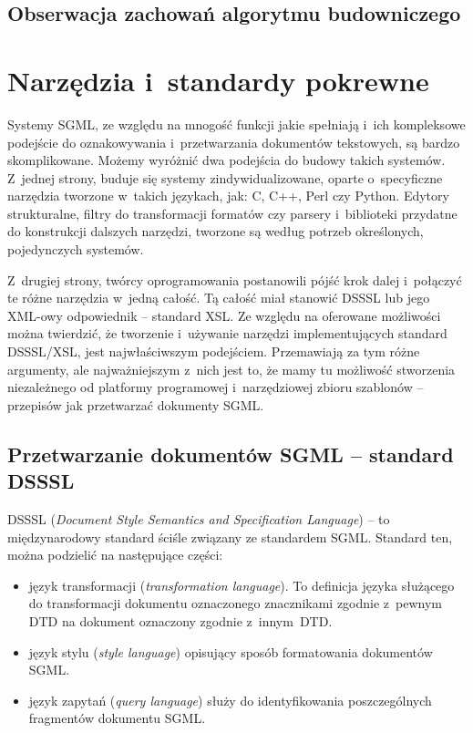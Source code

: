 \documentclass[document]{xmgr}
\begin{document}
\section{Obserwacja zachowań algorytmu budowniczego}

\chapter{Narzędzia i~standardy pokrewne}

Systemy SGML, ze względu na mnogość funkcji jakie spełniają i~ich
kompleksowe podejście do oznakowywania i~przetwarzania dokumentów
tekstowych, są bardzo skomplikowane. Możemy wyróżnić dwa podejścia do
budowy takich systemów.  Z~jednej strony, buduje się systemy
zindywidualizowane, oparte o~specyficzne narzędzia tworzone w~takich
językach, jak: C, C++, Perl czy Python. Edytory strukturalne, filtry
do transformacji formatów czy parsery i~biblioteki
przydatne do konstrukcji dalszych narzędzi, tworzone są według potrzeb
określonych, pojedynczych systemów.

Z~drugiej strony, twórcy oprogramowania postanowili pójść krok dalej
i~połączyć te różne narzędzia w~jedną całość. Tą całość miał stanowić
DSSSL lub jego XML-owy odpowiednik -- standard XSL. Ze względu na
oferowane możliwości można twierdzić, że tworzenie i~używanie narzędzi
implementujących standard DSSSL/XSL, jest najwłaściwszym
podejściem. Przemawiają za tym różne argumenty, ale najważniejszym
z~nich jest to, że mamy tu możliwość stworzenia niezależnego od
platformy programowej i~narzędziowej zbioru szablonów -- przepisów jak
przetwarzać dokumenty SGML.

\section{Przetwarzanie dokumentów SGML -- standard DSSSL\label{s:dsssl}}

DSSSL (\textit{Document Style Semantics and Specification Language\/})
-- to międzynarodowy standard ściśle związany ze standardem SGML.
Standard ten, można podzielić na następujące części:

\begin{itemize}
\item język transformacji (\textit{transformation language\/}).  To
  definicja języka służącego do transformacji dokumentu oznaczonego
  znacznikami zgodnie z~pewnym DTD na dokument oznaczony zgodnie
  z~innym~DTD.
\item język stylu (\textit{style language\/}) opisujący sposób
  formatowania dokumentów SGML.
\item język zapytań (\textit{query language\/}) służy do
  identyfikowania poszczególnych fragmentów dokumentu SGML.
\end{itemize}
\end{document}
